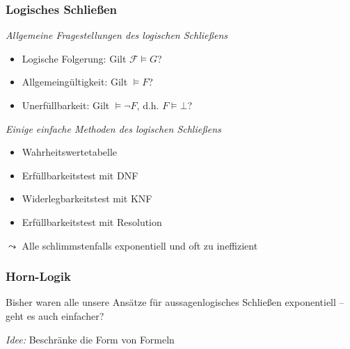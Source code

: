 \documentclass[aspectratio=1610,onlymath]{beamer}
\begin{document}
\maketitle


\begin{frame}\frametitle{Logisches Schließen}

\emph{Allgemeine Fragestellungen des logischen Schließens}
\begin{itemize}
\item Logische Folgerung: Gilt $\mathcal{F}\models G$?
\item Allgemeingültigkeit: Gilt $\models F$?
\item Unerfüllbarkeit: Gilt $\models \neg F$, d.h. $F\models\bot$?
\end{itemize}\bigskip

\emph{Einige einfache Methoden des logischen Schließens}
\begin{itemize}
\item Wahrheitswertetabelle
\item Erfüllbarkeitstest mit DNF
\item Widerlegbarkeitstest mit KNF
\item Erfüllbarkeitstest mit Resolution
\end{itemize}
$\leadsto$ Alle schlimmstenfalls exponentiell und oft zu ineffizient

\end{frame}


\begin{frame}\frametitle{Horn-Logik}

Bisher waren alle unsere Ansätze für aussagenlogisches Schließen exponentiell -- geht es auch einfacher?
\bigskip\pause

\emph{Idee:} Beschränke die Form von Formeln
\bigskip


\pause
{}

\end{frame}
\end{document}
